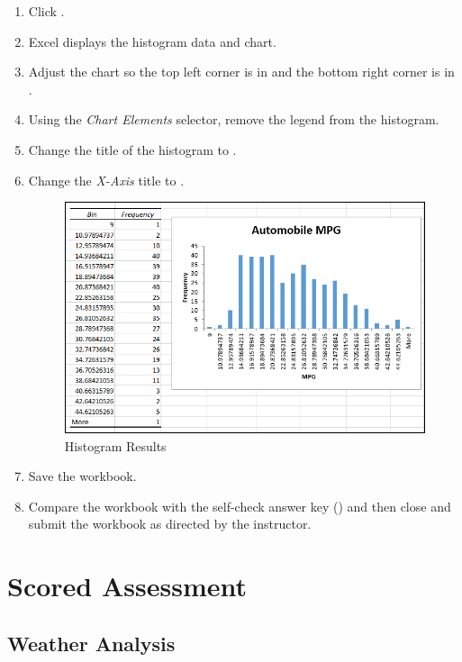 \begin{enumbox}
\begin{enumerate}
		\item Click .
		\item Excel displays the histogram data and chart. 
		\item Adjust the chart so the top left corner is in  and the bottom right corner is in .
		\item Using the \textit{Chart Elements} selector, remove the legend from the histogram.
		\item Change the title of the histogram to .
		\item Change the \textit{X-Axis} title to .
	
		\begin{figure}[H]
			\centering
			\includegraphics[width=\maxwidth{.95\linewidth}]{gfx/ch09_fig77}
			\caption{Histogram Results}
			\label{09:fig77}
		\end{figure}
		\item Save the  workbook.
		\item Compare the workbook with the self-check answer key () and then close and submit the  workbook as directed by the instructor.
	
	\end{enumerate}
\end{enumbox}

\section{Scored Assessment}

\subsection{Weather Analysis}

